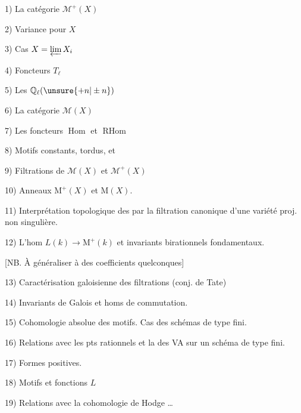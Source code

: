 
1) La catégorie $\mathcal{M}^+(X)$

2) Variance pour $X$

3) Cas $X=\varprojlim X_i$

4) Foncteurs $T_\ell$

5) Les $\mathbb{Q}_\ell(\unsure{+n|\pm n})$

6) La catégorie $\mathcal{M}(X)$

7) Les foncteurs $\operatorname{Hom}$ et $\operatorname{RHom}$

8) Motifs constants, tordus, et 

9) Filtrations de $\mathcal{M}(X)$ et $\mathcal{M}^+(X)$

10) Anneaux $\mathrm{M}^+(X)$ et $\mathrm{M}(X)$.

11) Interprétation topologique des
par la filtration canonique d'une variété proj. non singulière.

12) L'hom $L(k)\longrightarrow \mathrm{M}^+(k)$ et invariants birationnels fondamentaux.

[NB. À généraliser à des coefficients quelconques]

13) Caractérisation galoisienne des filtrations (conj. de Tate)

14) Invariants de Galois et homs de commutation.

15) Cohomologie absolue des motifs. Cas des schémas de type fini.

16) Relations avec les pts rationnels et la  des VA sur
un schéma de type fini.

17) Formes positives.

18) Motifs et fonctions $L$

19) Relations avec la cohomologie de Hodge \dots
